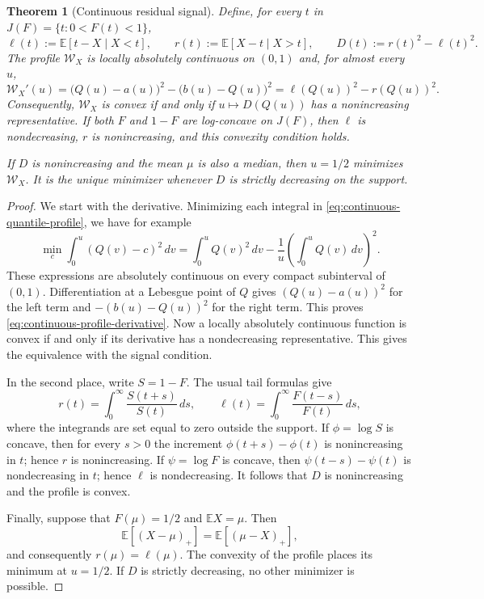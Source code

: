 \documentclass[a4paper]{amsart}
\numberwithin{equation}{section}
\newtheorem{theorem}{Theorem}[section]
\theoremstyle{remark}
\newcommand{\E}{\mathbb E}
\newcommand{\1}{\mathbf 1}
\begin{document}
\begin{theorem}[Continuous residual signal]
\label{thm:continuous-residual-signal}
Define, for every $t$ in $J(F)=\{t:0<F(t)<1\}$,
\begin{equation}\label{eq:continuous-residual-radii}
 \ell(t):=\E[t-X\mid X<t],\qquad
 r(t):=\E[X-t\mid X>t],\qquad D(t):=r(t)^2-\ell(t)^2.
\end{equation}
The profile $\mathcal W_X$ is locally absolutely continuous on $(0,1)$ and,
for almost every $u$,
\begin{equation}\label{eq:continuous-profile-derivative}
 \mathcal W_X'(u)
 =\bigl(Q(u)-a(u)\bigr)^2-\bigl(b(u)-Q(u)\bigr)^2
 =\ell(Q(u))^2-r(Q(u))^2.
\end{equation}
Consequently, $\mathcal W_X$ is convex if and only if
$u\mapsto D(Q(u))$ has a nonincreasing representative.  If both $F$ and
$1-F$ are log-concave on $J(F)$, then $\ell$ is nondecreasing, $r$ is
nonincreasing, and this convexity condition holds.

If $D$ is nonincreasing and the mean $\mu$ is also a median, then $u=1/2$
minimizes $\mathcal W_X$.  It is the unique minimizer whenever $D$ is strictly
decreasing on the support.
\end{theorem}

\begin{proof}
We start with the derivative.  Minimizing each integral in
\eqref{eq:continuous-quantile-profile}, we have for example
\[
 \min_c\int_0^u(Q(v)-c)^2\,dv
 =\int_0^uQ(v)^2\,dv-\frac1u\left(\int_0^uQ(v)\,dv\right)^2.
\]
These expressions are absolutely continuous on every compact subinterval of
$(0,1)$.  Differentiation at a Lebesgue point of $Q$ gives
$(Q(u)-a(u))^2$ for the left term and $-(b(u)-Q(u))^2$ for the right term.
This proves \eqref{eq:continuous-profile-derivative}.  Now a locally
absolutely continuous function is convex if and only if its derivative has a
nondecreasing representative.  This gives the equivalence with the signal
condition.

In the second place, write $S=1-F$.  The usual tail formulas give
\[
 r(t)=\int_0^\infty\frac{S(t+s)}{S(t)}\,ds,
 \qquad
 \ell(t)=\int_0^\infty\frac{F(t-s)}{F(t)}\,ds,
\]
where the integrands are set equal to zero outside the support.  If
$\phi=\log S$ is concave, then for every $s>0$ the increment
$\phi(t+s)-\phi(t)$ is nonincreasing in $t$; hence $r$ is nonincreasing.
If $\psi=\log F$ is concave, then
$\psi(t-s)-\psi(t)$ is nondecreasing in $t$; hence $\ell$ is
nondecreasing.  It follows that $D$ is nonincreasing and the profile is
convex.

Finally, suppose that $F(\mu)=1/2$ and $\E X=\mu$.  Then
\[
 \E[(X-\mu)_+]=\E[(\mu-X)_+],
\]
and consequently $r(\mu)=\ell(\mu)$.  The convexity of the profile places its
minimum at $u=1/2$.  If $D$ is strictly decreasing, no other minimizer is
possible.
\end{proof}
\end{document}
